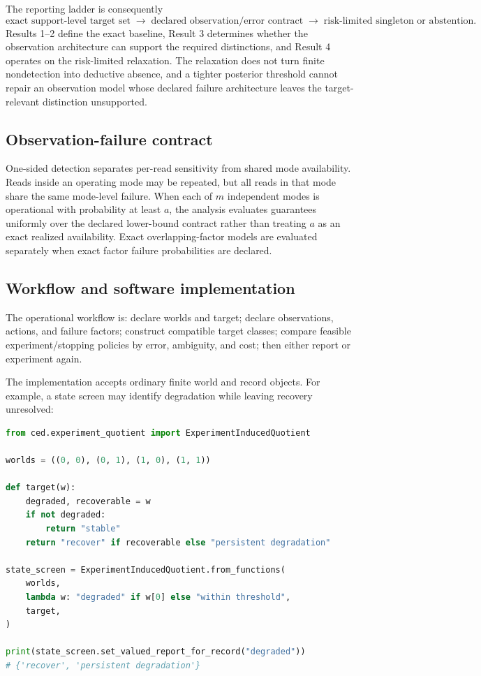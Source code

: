 \documentclass[11pt]{article}
\begin{document}
The reporting ladder is consequently
\[
\text{exact support-level target set}
\;\longrightarrow\;
\text{declared observation/error contract}
\;\longrightarrow\;
\text{risk-limited singleton or abstention}.
\]
Results 1--2 define the exact baseline, Result 3 determines whether the observation architecture can support the required distinctions, and Result 4 operates on the risk-limited relaxation. The relaxation does not turn finite nondetection into deductive absence, and a tighter posterior threshold cannot repair an observation model whose declared failure architecture leaves the target-relevant distinction unsupported.

\subsection{Observation-failure contract}
One-sided detection separates per-read sensitivity from shared mode availability. Reads inside an operating mode may be repeated, but all reads in that mode share the same mode-level failure. When each of $m$ independent modes is operational with probability at least $a$, the analysis evaluates guarantees uniformly over the declared lower-bound contract rather than treating $a$ as an exact realized availability. Exact overlapping-factor models are evaluated separately when exact factor failure probabilities are declared.

\subsection{Workflow and software implementation}
The operational workflow is: declare worlds and target; declare observations, actions, and failure factors; construct compatible target classes; compare feasible experiment/stopping policies by error, ambiguity, and cost; then either report or experiment again.

The implementation accepts ordinary finite world and record objects. For example, a state screen may identify degradation while leaving recovery unresolved:

\begin{lstlisting}[language=Python]
from ced.experiment_quotient import ExperimentInducedQuotient

worlds = ((0, 0), (0, 1), (1, 0), (1, 1))

def target(w):
    degraded, recoverable = w
    if not degraded:
        return "stable"
    return "recover" if recoverable else "persistent degradation"

state_screen = ExperimentInducedQuotient.from_functions(
    worlds,
    lambda w: "degraded" if w[0] else "within threshold",
    target,
)

print(state_screen.set_valued_report_for_record("degraded"))
# {'recover', 'persistent degradation'}
\end{lstlisting}
\end{document}
